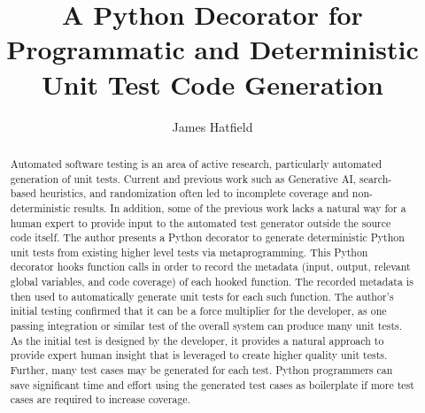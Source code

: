 \documentclass[%
  anonymous=true,%
  authordraft=false,%
  format=sigconf,%
  review=false,%
  screen=true,%
  timestamp=false,%
  pbalance,%
]{acmart}
\begin{document}

\title{A Python Decorator for Programmatic and Deterministic Unit Test Code Generation}

\author{James Hatfield}


  

\begin{abstract}
  Automated software testing is an area of active research, 
  particularly automated generation of unit tests. 
  Current and previous work such as Generative AI, search-based heuristics, and 
  randomization often led to incomplete coverage and non-deterministic results.
  In addition, some of the previous work lacks a natural way for a human expert 
  to provide input to the automated test generator outside the source code itself. 
  The author presents a Python decorator to generate deterministic Python 
  unit tests from existing higher level tests via metaprogramming.  
  This Python decorator hooks function calls in order to record the 
  metadata (input, output, relevant global variables, and code coverage) 
  of each hooked function. 
  The recorded metadata is then used to automatically generate unit 
  tests for each such function.
  The author's initial testing confirmed that it can 
  be a force multiplier for the developer, 
  as one passing integration or similar test of the overall 
  system can produce many unit tests.  
  As the initial test is designed by the developer, it provides a natural 
  approach to provide expert human insight that is leveraged to create 
  higher quality unit tests.
  Further, many test cases may be generated for each test.  
  Python programmers can save significant time and effort using the 
  generated test cases as boilerplate if more test cases are required to 
  increase coverage.  

\end{abstract}
\end{document}
